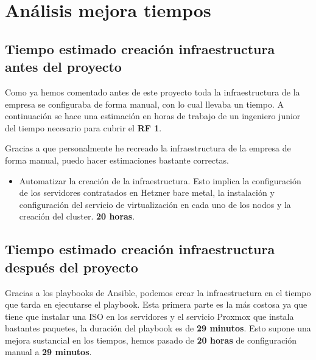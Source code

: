 \section{Análisis mejora tiempos}
\label{analisis_tiempos} 
\subsection{Tiempo estimado creación infraestructura antes del proyecto}
\begin{text}
	Como ya hemos comentado antes de este proyecto toda la infraestructura de la empresa se configuraba de forma manual, con lo cual llevaba un tiempo. A continuación se hace una estimación en horas de trabajo de un ingeniero junior del tiempo necesario para cubrir el \textbf{RF 1}.
	
	Gracias a que personalmente he recreado la infraestructura de la empresa de forma manual, puedo hacer estimaciones bastante correctas.
	
	\begin{itemize}
		\item Automatizar la creación de la infraestructura. Esto implica la configuración de los servidores contratados en Hetzner bare metal, la instalación y configuración del servicio de virtualización en cada uno de los nodos y la creación del cluster.  \textbf{20 horas}.
	\end{itemize}
	
	
\end{text}

\subsection{Tiempo estimado creación infraestructura después del proyecto}
\begin{text}
	Gracias a los playbooks de Ansible, podemos crear la infraestructura en el tiempo que tarda en ejecutarse el playbook. Esta primera parte es la más costosa ya que tiene que instalar una ISO en los servidores y el servicio Proxmox que instala bastantes paquetes, la duración del playbook es de \textbf{29 minutos}. Esto supone una mejora sustancial en los tiempos, hemos pasado de \textbf{20 horas} de configuración manual a \textbf{29 minutos}.
\end{text}

